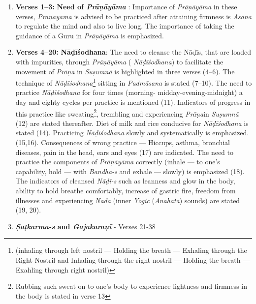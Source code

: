 \begin{enumerate}
\item \textbf{Verses 1--3:} \textbf{Need of \textit{Prāṇāyāma}} : Importance of \textit{Prāṇāyāma} in these verses, \textit{Prāṇāyāma} is advised  to be practiced after attaining  firmness is \textit{Āsana} to regulate the mind  and also to live long. The importance of taking the guidance of a Guru in  \textit{Prāṇāyāma} is emphasized.  

\item \textbf{Verses 4--20:} \textbf{Nāḍīśodhana}: The need to cleanse the Nāḍīs, that are loaded with impurities, through \textit{Prāṇāyāma} ( \textit{Nāḍīśodhana}) to facilitate the movement of \textit{Prāṇa} in \textit{Suṣumnā} is highlighted in three verses (4--6). The technique of \textit{Nāḍīśodhana}\footnote{(inhaling through left nostril --- Holding the breath --- Exhaling through the Right Nostril and Inhaling through the right nostril --- Holding the breath --- Exahling through right nostril)} sitting in \textit{Padmāsana} is stated (7--10). The need to practice \textit{Nāḍīśodhana} for four times (morning- midday-evening-midnight) a day and eighty cycles per practice is mentioned (11). Indicators of progress in this practice like sweating\footnote{Rubbing such sweat on to one’s body to experience lightness and firmness in the body is stated in verse 13}, trembling and experiencing \textit{Prāṇa}in \textit{Suṣumnā} (12) are stated thereafter. Diet of milk and rice conducive for \textit{Nāḍīśodhana} is stated (14). Practicing \textit{Nāḍīśodhana} slowly and systematically is emphasized. (15,16).  Consequences of wrong practice --- Hiccups, asthma, bronchial diseases, pain in the head, ears and eyes (17) are indicated. The need to practice the components of \textit{Prāṇāyāma} correctly (inhale --- to one’s capability, hold --- with \textit{Bandha-s}  and exhale --- slowly) is emphasized (18).  The indicators of cleansed \textit{Nāḍī-s} such as leanness and glow in the body, ability to hold breathe comfortably, increase of gastric fire, freedom from illnesses and experiencing \textit{Nāda} (inner \textit{Yogic} (\textit{Anahata}) sounds) are stated (19, 20).

\item \textbf{\textit{Ṣaṭkarma-s} and \textit{Gajakaraṇī}} - Verses  21-38


\end{enumerate}
